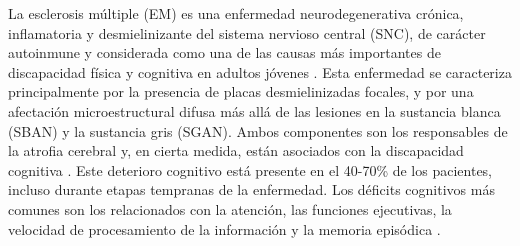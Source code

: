 
La esclerosis múltiple (EM) es una enfermedad neurodegenerativa crónica, inflamatoria y desmielinizante del sistema nervioso central (SNC), de carácter autoinmune y considerada como una de las causas más importantes de discapacidad física y cognitiva en adultos jóvenes \cite{Rocca2015ClinicalSclerosis}. Esta enfermedad se caracteriza principalmente por la presencia de placas desmielinizadas focales, y por una afectación microestructural difusa más allá de las lesiones en la sustancia blanca (SBAN) y la sustancia gris (SGAN). Ambos componentes son los responsables de la atrofia cerebral y, en cierta medida, están asociados con la discapacidad cognitiva \cite{Kutzelnigg2014PathologyDiseases}. Este deterioro cognitivo está presente en el 40-70\% de los pacientes, incluso durante etapas tempranas de la enfermedad. Los déficits cognitivos más comunes son los relacionados con la atención, las funciones ejecutivas, la velocidad de procesamiento de la información y la memoria episódica \cite{Chiaravalloti2008CognitiveSclerosisb}. 

